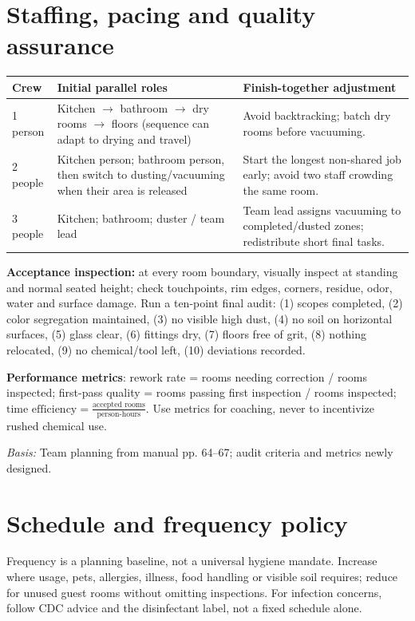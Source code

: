 \documentclass[10pt,letterpaper,oneside]{article}
\newcommand{\sources}[1]{\par{\small\color{graytext}\textit{Basis:} #1}\par}
\newcommand{\smalltable}{\par\small\renewcommand{\arraystretch}{1.24}}
\newcommand{\restorenormalfonttable}{\par\normalsize\renewcommand{\arraystretch}{1}}
\begin{document}
\section{Staffing, pacing and quality assurance}
\smalltable\begin{tabularx}{\linewidth}{p{.17\linewidth}X X}\toprule
Crew & Initial parallel roles & Finish-together adjustment\\\midrule
1 person & Kitchen \(\to\) bathroom \(\to\) dry rooms \(\to\) floors (sequence can adapt to drying and travel) & Avoid backtracking; batch dry rooms before vacuuming.\\
2 people & Kitchen person; bathroom person, then switch to dusting/vacuuming when their area is released & Start the longest non-shared job early; avoid two staff crowding the same room.\\
3 people & Kitchen; bathroom; duster / team lead & Team lead assigns vacuuming to completed/dusted zones; redistribute short final tasks.\\\bottomrule\end{tabularx}\restorenormalfonttable
\textbf{Acceptance inspection:} at every room boundary, visually inspect at standing and normal seated height; check touchpoints, rim edges, corners, residue, odor, water and surface damage. Run a ten-point final audit: (1) scopes completed, (2) color segregation maintained, (3) no visible high dust, (4) no soil on horizontal surfaces, (5) glass clear, (6) fittings dry, (7) floors free of grit, (8) nothing relocated, (9) no chemical/tool left, (10) deviations recorded. \par
\textbf{Performance metrics}: rework rate = rooms needing correction / rooms inspected; first-pass quality = rooms passing first inspection / rooms inspected; \(\text{time efficiency}=\frac{\text{accepted rooms}}{\text{person-hours}}\). Use metrics for coaching, never to incentivize rushed chemical use.\sources{Team planning from manual pp. 64--67; audit criteria and metrics newly designed.}

\section{Schedule and frequency policy}
Frequency is a planning baseline, not a universal hygiene mandate. Increase where usage, pets, allergies, illness, food handling or visible soil requires; reduce for unused guest rooms without omitting inspections. For infection concerns, follow CDC advice and the disinfectant label, not a fixed schedule alone.
\end{document}
